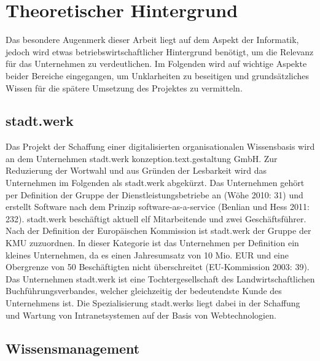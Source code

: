 \documentclass[a4paper]{scrartcl}
\begin{document}
\newpage

\section{Theoretischer Hintergrund}
Das besondere Augenmerk dieser Arbeit liegt auf dem Aspekt der Informatik, jedoch wird etwas betriebswirtschaftlicher Hintergrund benötigt, um die Relevanz für das Unternehmen zu verdeutlichen. Im Folgenden wird auf wichtige Aspekte beider Bereiche eingegangen, um Unklarheiten zu beseitigen und grundsätzliches Wissen für die spätere Umsetzung des Projektes zu vermitteln.

\subsection{stadt.werk}
Das Projekt der Schaffung einer digitalisierten organisationalen Wissensbasis wird an dem Unternehmen stadt.werk konzeption.text.gestaltung GmbH. Zur Reduzierung der Wortwahl und aus Gründen der Lesbarkeit wird das Unternehmen im Folgenden als stadt.werk abgekürzt. Das Unternehmen gehört per Definition der Gruppe der Dienstleistungsbetriebe an (Wöhe 2010: 31) und erstellt Software nach dem Prinzip software-as-a-service (Benlian und Hess 2011: 232). stadt.werk beschäftigt aktuell elf Mitarbeitende und zwei Geschäftsführer. Nach der Definition der Europäischen Kommission ist stadt.werk der Gruppe der KMU zuzuordnen. In dieser Kategorie ist das Unternehmen per Definition ein kleines Unternehmen, da es einen Jahresumsatz von 10 Mio. EUR und eine Obergrenze von 50 Beschäftigten nicht überschreitet (EU-Kommission 2003: 39). \\
Das Unternehmen stadt.werk ist eine Tochtergesellschaft des Landwirtschaftlichen Buchführungsverbandes, welcher gleichzeitig der bedeutendste Kunde des Unternehmens ist. Die Spezialisierung stadt.werks liegt dabei in der Schaffung und Wartung von Intranetsystemen auf der Basis von Webtechnologien.

\subsection{Wissensmanagement}
\end{document}
